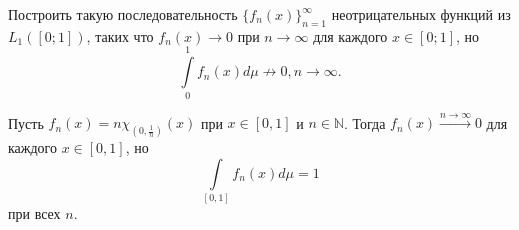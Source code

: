 \begin{task}{5}
Построить такую последовательность $\lbrace f_n(x)\rbrace_{n=1}^\infty$ неотрицательных функций из $L_1([0;1])$, таких что $f_n(x) \rightarrow 0$ при $n \rightarrow \infty$ для каждого $x \in [0; 1]$, но
\[
\int\limits_0^1 f_n(x)d\mu \nrightarrow 0, n \rightarrow \infty.
\]
\end{task}

\begin{solution} 
Пусть $f_n(x) = n\chi_{(0,\frac{1}{n})}(x)$ при $x \in [0, 1]$ и $n \in \mathbb{N}$. Тогда $f_n(x) \xrightarrow{n \rightarrow \infty} 0$ для каждого $x \in [0, 1]$, но 
\[
\int\limits_{[0,1]}f_n(x)d\mu = 1
\]
при всех $n$.
\end{solution}